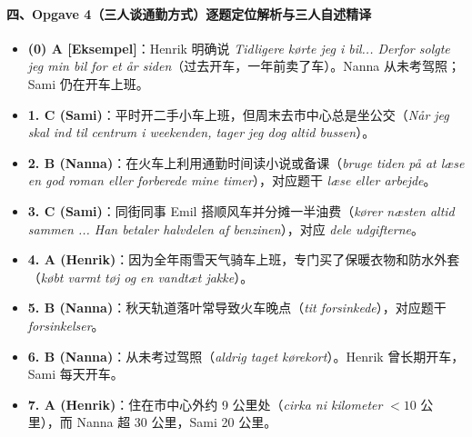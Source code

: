 \paragraph*{四、Opgave 4（三人谈通勤方式）逐题定位解析与三人自述精译}
\begin{itemize}
  \item \textbf{(0) A [Eksempel]}：Henrik 明确说 \textit{Tidligere kørte jeg i bil... Derfor solgte jeg min bil for et år siden}（过去开车，一年前卖了车）。Nanna 从未考驾照；Sami 仍在开车上班。
  \item \textbf{1. C (Sami)}：平时开二手小车上班，但周末去市中心总是坐公交（\textit{Når jeg skal ind til centrum i weekenden, tager jeg dog altid bussen}）。
  \item \textbf{2. B (Nanna)}：在火车上利用通勤时间读小说或备课（\textit{bruge tiden på at læse en god roman eller forberede mine timer}），对应题干 \textit{læse eller arbejde}。
  \item \textbf{3. C (Sami)}：同街同事 Emil 搭顺风车并分摊一半油费（\textit{kører næsten altid sammen ... Han betaler halvdelen af benzinen}），对应 \textit{dele udgifterne}。
  \item \textbf{4. A (Henrik)}：因为全年雨雪天气骑车上班，专门买了保暖衣物和防水外套（\textit{købt varmt tøj og en vandtæt jakke}）。
  \item \textbf{5. B (Nanna)}：秋天轨道落叶常导致火车晚点（\textit{tit forsinkede}），对应题干 \textit{forsinkelser}。
  \item \textbf{6. B (Nanna)}：从未考过驾照（\textit{aldrig taget kørekort}）。Henrik 曾长期开车，Sami 每天开车。
  \item \textbf{7. A (Henrik)}：住在市中心外约 9 公里处（\textit{cirka ni kilometer} $< 10$ 公里），而 Nanna 超 30 公里，Sami 20 公里。
\end{itemize}

